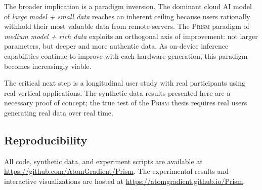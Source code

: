 \documentclass[11pt,a4paper]{article}
\newcommand{\echostream}{\textsc{Prism}}
\begin{document}
The broader implication is a paradigm inversion. The dominant cloud AI model
of \emph{large model + small data} reaches an inherent ceiling because users
rationally withhold their most valuable data from remote servers. The
\echostream{} paradigm of \emph{medium model + rich data} exploits an
orthogonal axis of improvement: not larger parameters, but deeper and more
authentic data. As on-device inference capabilities continue to improve with
each hardware generation, this paradigm becomes increasingly viable.

The critical next step is a longitudinal user study with real participants
using real vertical applications. The synthetic data results presented here
are a necessary proof of concept; the true test of the \echostream{} thesis
requires real users generating real data over real time.

\subsection*{Reproducibility}

All code, synthetic data, and experiment scripts are available at
\url{https://github.com/AtomGradient/Prism}. The experimental
results and interactive visualizations are hosted at
\url{https://atomgradient.github.io/Prism}.


\end{document}
